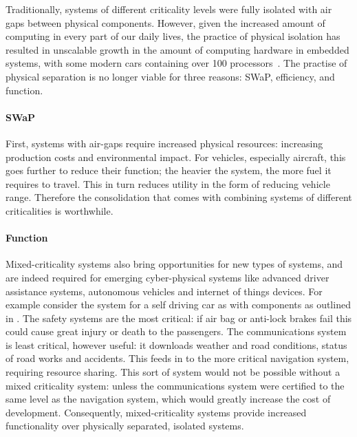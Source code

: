 Traditionally, systems of different criticality levels were fully isolated with
air gaps between physical components. However, given the increased amount of
computing in every part of our daily lives, the practice of physical isolation
has resulted in unscalable growth in the amount of computing hardware in
embedded systems, with some modern cars containing over 100
processors~\citep{Hergenhan_Heiser_08}. The practise of physical separation is no 
longer viable for three reasons: \gls{SWaP}, efficiency, and function.

\paragraph{SWaP} First, systems with air-gaps require increased physical
resources: increasing production costs and environmental impact.
For vehicles, especially aircraft, this goes further to reduce their function; the
heavier the system,  the more fuel it requires to travel. This in turn reduces
utility in the form of reducing vehicle range. Therefore the consolidation that comes
with combining systems of different criticalities is worthwhile.  

\paragraph{Function} 
Mixed-criticality systems also bring opportunities for new types of
systems, and are indeed required for emerging cyber-physical systems like
advanced driver assistance systems, autonomous vehicles and internet of things devices.
For example consider the system for a self driving
car as with components as outlined in .  The safety
systems are the most critical: if air bag or anti-lock brakes fail this could
cause great injury or death to the passengers.  The communications system is
least critical, however useful: it downloads weather and road conditions,
status of road works and accidents.  This feeds in to the more critical
navigation system, requiring resource sharing.  This sort of system would not
be possible without a mixed criticality system: unless the communications
system were certified to the same level as the navigation system, which would
greatly increase the cost of development.  Consequently, mixed-criticality
systems provide increased functionality over physically separated, isolated
systems.

